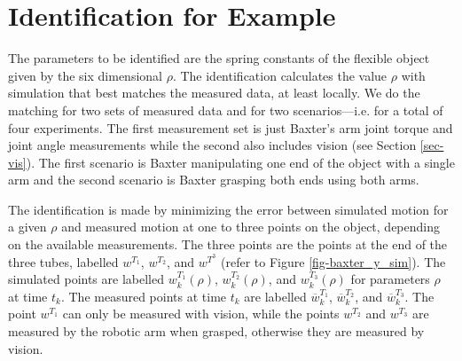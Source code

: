 \documentclass[runningheads,a4paper]{llncs}
\begin{document}
\section{Identification for Example}
\label{sec-id_eg}
The parameters to be identified are the spring constants of the flexible object given by the six dimensional $\rho$.  The identification calculates the value $\rho$ with simulation that best matches the measured data, at least locally. We do the matching for two sets of measured data and for two scenarios---i.e. for a total of four experiments.  The first measurement set is just Baxter's arm joint torque and joint angle measurements while the second also includes vision (see Section \ref{sec-vis}).  The first scenario is Baxter manipulating one end of the object with a single arm and the second scenario is Baxter grasping both ends using both arms.

The identification is made by minimizing the error between simulated motion for a given $\rho$ and measured motion at one to three points on the object, depending on the available measurements. The three points are the points at the end of the three tubes, labelled $w^{T_1}$, $w^{T_2}$, and $w^{T^3}$ (refer to Figure \ref{fig-baxter_y_sim}). The simulated points are labelled $w_k^{T_1}(\rho)$, $w_k^{T_2} (\rho)$, and $w_k^{T_3}(\rho)$ for parameters $\rho$ at time $t_k$. The measured points at time $t_k$ are labelled $\overline{w}_k^{T_1}$, $\overline{w}_k^{T_2}$, and $\overline{w}_k^{T_3}$. The point $w^{T_1}$ can only be measured with vision, while the points $w^{T_2}$ and $w^{T_3}$ are measured by the robotic arm when grasped, otherwise they are measured by vision.  
\end{document}
